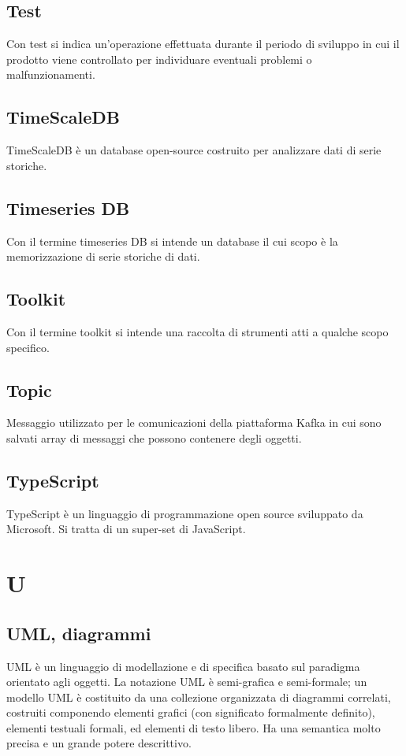 \subsection{Test}  Con test si indica un'operazione effettuata durante il periodo di sviluppo in cui il prodotto viene controllato per individuare eventuali problemi o malfunzionamenti.
\subsection{TimeScaleDB}  TimeScaleDB è un database open-source costruito per analizzare dati di serie storiche.
\subsection{Timeseries DB}  Con il termine timeseries DB si intende un database il cui scopo è la memorizzazione di serie storiche di dati.
\subsection{Toolkit}  Con il termine toolkit si intende una raccolta di strumenti atti a qualche scopo specifico.
\subsection{Topic}  Messaggio utilizzato per le comunicazioni della piattaforma Kafka in cui sono salvati array di messaggi che possono contenere degli oggetti.
\subsection{TypeScript}  TypeScript è un linguaggio di programmazione open source sviluppato da Microsoft. Si tratta di un super-set di JavaScript.

\newpage \section{U}
\subsection{UML, diagrammi} UML è un linguaggio di modellazione e di specifica basato sul paradigma orientato agli oggetti. La notazione UML è semi-grafica e semi-formale; un modello UML è costituito da una collezione organizzata di diagrammi correlati, costruiti componendo elementi grafici (con significato formalmente definito), elementi testuali formali, ed elementi di testo libero. Ha una semantica molto precisa e un grande potere descrittivo. 
